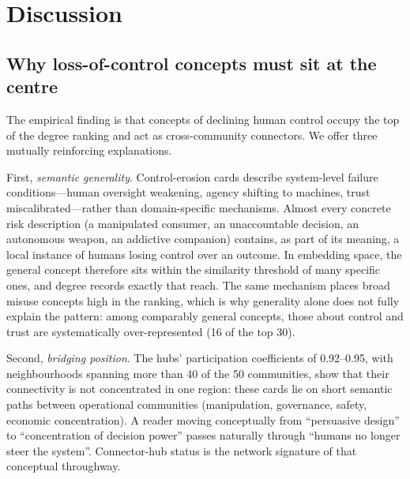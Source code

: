 \documentclass[fleqn,10pt]{wlscirep}
\begin{document}
\section*{Discussion}

\subsection*{Why loss-of-control concepts must sit at the centre}

The empirical finding is that concepts of declining human control occupy the
top of the degree ranking and act as cross-community connectors. We offer
three mutually reinforcing explanations.

First, \emph{semantic generality}. Control-erosion cards describe
system-level failure conditions---human oversight weakening, agency shifting
to machines, trust miscalibrated---rather than domain-specific mechanisms.
Almost every concrete risk description (a manipulated consumer, an
unaccountable decision, an autonomous weapon, an addictive companion)
contains, as part of its meaning, a local instance of humans losing control
over an outcome. In embedding space, the general concept therefore sits
within the similarity threshold of many specific ones, and degree records
exactly that reach. The same mechanism places broad misuse concepts high in
the ranking, which is why generality alone does not fully explain the
pattern: among comparably general concepts, those about control and trust
are systematically over-represented (16 of the top 30).

Second, \emph{bridging position}. The hubs' participation coefficients of
0.92--0.95, with neighbourhoods spanning more than 40 of the 50
communities, show that their connectivity is not concentrated in one
region: these cards lie on short semantic paths between operational
communities (manipulation, governance, safety, economic concentration). A
reader moving conceptually from ``persuasive design'' to ``concentration of
decision power'' passes naturally through ``humans no longer steer the
system''. Connector-hub status is the network signature of that conceptual
throughway.
\end{document}
